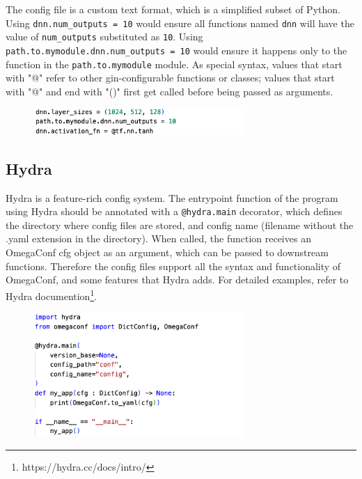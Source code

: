 \documentclass{itatnew}
\begin{document}
The config file is a custom text format, which is a simplified subset of Python.
Using \texttt{dnn.num_outputs = 10} would ensure all functions named \texttt{dnn} will have the value of \texttt{num_outputs} substituted as \texttt{10}.
Using \texttt{path.to.mymodule.dnn.num_outputs = 10} would ensure it happens only to the function in the \texttt{path.to.mymodule} module.
As special syntax, values that start with "@" refer to other gin-configurable functions or classes; values that start with "@" and end with "()" first get called before being passed as arguments.

\begin{figure}[H]
    \centering
    \includegraphics[width=8cm]{g2.png}
\end{figure}

\subsection{Hydra}

Hydra is a feature-rich config system. The entrypoint function of the program using Hydra should be annotated with a \texttt{@hydra.main} decorator, which defines the directory where config files are stored, and config name (filename without the .yaml extension in the directory). When called, the function receives an OmegaConf cfg object as an argument, which can be passed to downstream functions. Therefore the config files support all the syntax and functionality of OmegaConf, and some features that Hydra adds. For detailed examples, refer to Hydra documention\footnote{https://hydra.cc/docs/intro/}.

\begin{figure}[H]
    \centering
    \includegraphics[width=8cm]{h.png}
\end{figure}
\end{document}
